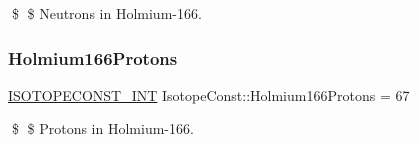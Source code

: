 \$ \$ Neutrons in Holmium-\/166. \mbox{\label{group___isotope_const-_holmium-_ho166_gaba154e7b6e2a087d64e8bce3d1561e91}} 
\subsubsection{\texorpdfstring{Holmium166\+Protons}{Holmium166Protons}}
{\footnotesize\ttfamily \mbox{\hyperlink{group___isotope_const-_macros_ga5f18360b3e99483a35c32d789e62621c}{I\+S\+O\+T\+O\+P\+E\+C\+O\+N\+S\+T\+\_\+\+I\+NT}} Isotope\+Const\+::\+Holmium166\+Protons = 67}

\$ \$ Protons in Holmium-\/166. 